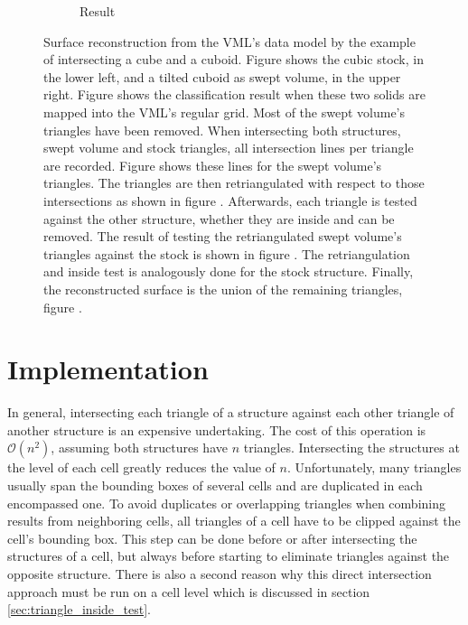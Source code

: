 \begin{figure}
\begin{subfigure}[t]{0.3\textwidth}
		\caption{Result}
		\label{fig:cube2_result}
	\end{subfigure}
	\caption{
		Surface reconstruction from the VML's data model by the example of intersecting a cube and a cuboid.
		Figure  shows the cubic stock, in the lower left, and a tilted cuboid as swept volume, in the upper right.
		Figure  shows the classification result when these two solids are mapped into the VML's regular grid.
		Most of the swept volume's triangles have been removed.
		When intersecting both structures, \ie swept volume and stock triangles, all intersection lines per triangle are recorded.
		Figure  shows these lines for the swept volume's triangles.
		The triangles are then retriangulated with respect to those intersections as shown in figure .
		Afterwards, each triangle is tested against the other structure, whether they are inside and can be removed.
		The result of testing the retriangulated swept volume's triangles against the stock is shown in figure .
		The retriangulation and inside test is analogously done for the stock structure.
		Finally, the reconstructed surface is the union of the remaining triangles, figure .
	}
	\label{fig:cube2}
\end{figure}


\section{Implementation}
\label{sec:direct_intersection_implementation}

In general, intersecting each triangle of a structure against each other triangle of another structure is an expensive undertaking.
The cost of this operation is $\mathcal{O}(n^2)$, assuming both structures have $n$ triangles.
Intersecting the structures at the level of each cell greatly reduces the value of $n$.
Unfortunately, many triangles usually span the bounding boxes of several cells and are duplicated in each encompassed one.
To avoid duplicates or overlapping triangles when combining results from neighboring cells, all triangles of a cell have to be clipped against the cell's bounding box.
This step can be done before or after intersecting the structures of a cell, but always before starting to eliminate triangles against the opposite structure.
There is also a second reason why this direct intersection approach must be run on a cell level which is discussed in section \ref{sec:triangle_inside_test}.

